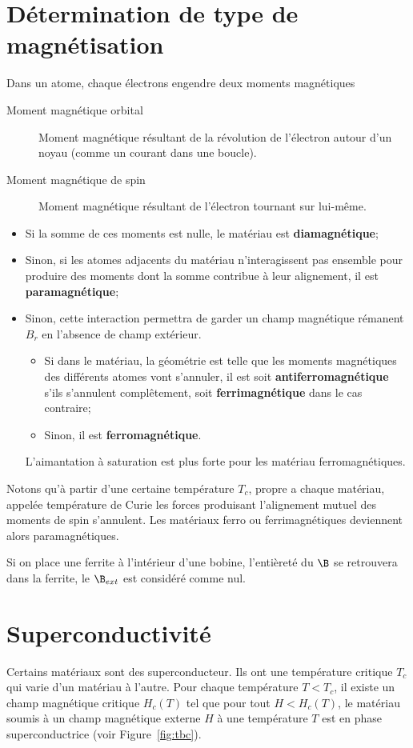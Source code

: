 \section{Détermination de type de magnétisation}
Dans un atome, chaque électrons engendre deux moments magnétiques
\begin{description}
	\item[Moment magnétique orbital]
		Moment magnétique résultant de la révolution de l'électron autour d'un noyau (comme un courant dans une boucle).
	\item[Moment magnétique de spin]
		Moment magnétique résultant de l'électron tournant sur lui-même.
\end{description}
\begin{itemize}
	\item Si la somme de ces moments est nulle, le matériau est \textbf{diamagnétique};
	\item Sinon, si les atomes adjacents du matériau n'interagissent pas ensemble pour produire des moments dont la somme contribue à leur alignement, il est \textbf{paramagnétique};
	\item Sinon, cette interaction permettra de garder un champ magnétique rémanent $B_r$ en l'absence de champ extérieur.
		\begin{itemize}
			\item Si dans le matériau, la géométrie est telle que les moments magnétiques des différents atomes vont s'annuler, il est soit \textbf{antiferromagnétique} s'ils s'annulent complêtement, soit \textbf{ferrimagnétique} dans le cas contraire;
			\item Sinon, il est \textbf{ferromagnétique}.
		\end{itemize}
		L'aimantation à saturation est plus forte pour les matériau ferromagnétiques.
\end{itemize}
Notons qu'à partir d'une certaine température $T_c$, propre a chaque matériau, appelée température de Curie les forces produisant l'alignement mutuel des moments de spin s'annulent. Les matériaux ferro ou ferrimagnétiques deviennent alors paramagnétiques.

Si on place une ferrite à l'intérieur d'une bobine, l'entièreté du $\B$ se retrouvera dans la ferrite, le $\B_{ext}$ est considéré comme nul.

\section{Superconductivité}
Certains matériaux sont des superconducteur.
Ils ont une température critique $T_c$ qui varie d'un matériau à l'autre.
Pour chaque température $T < T_c$, il existe un champ magnétique critique $H_c(T)$ tel que
pour tout $H < H_c(T)$, le matériau soumis à un champ magnétique externe $H$ à une température $T$ est en phase superconductrice
(voir Figure~\ref{fig:tbc}).

